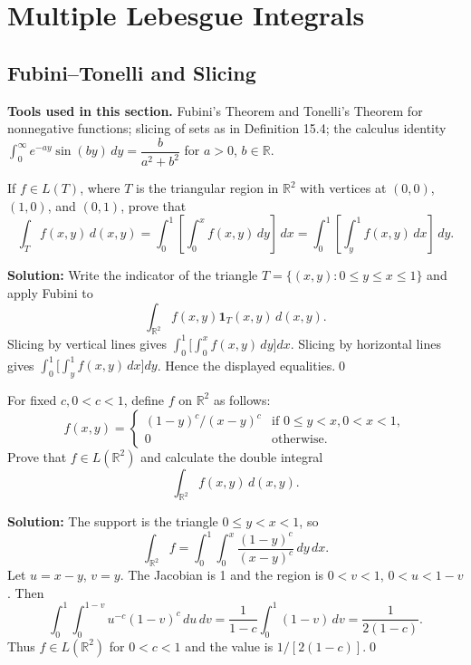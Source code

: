 \chapter{Multiple Lebesgue Integrals}


\section{Fubini--Tonelli and Slicing}
\noindent\textbf{Tools used in this section.} Fubini's Theorem and Tonelli's Theorem for nonnegative functions; slicing of sets as in Definition 15.4; the calculus identity \(\int_0^{\infty} e^{-ay} \sin(by) \, dy = \dfrac{b}{a^2 + b^2}\) for \(a>0\), \(b\in\mathbb{R}\).
 


\begin{problembox}
If \( f \in L(T) \), where \( T \) is the triangular region in \( \mathbb{R}^2 \) with vertices at \((0, 0)\), \((1, 0)\), and \((0, 1)\), prove that
\[
\int_T f(x, y) \, d(x, y) = \int_0^1 \left[ \int_0^x f(x, y) \, dy \right] \, dx = \int_0^1 \left[ \int_y^1 f(x, y) \, dx \right] \, dy.
\]
\end{problembox}

\noindent\textbf{Solution:}
Write the indicator of the triangle \(T=\{(x,y): 0\le y \le x \le 1\}\) and apply Fubini to
\[
\int_{\mathbb{R}^2} f(x,y) \mathbf{1}_T(x,y)\, d(x,y).
\]
Slicing by vertical lines gives \(\int_0^1\!\big[\int_0^x f(x,y)\,dy\big]dx\). Slicing by horizontal lines gives \(\int_0^1\!\big[\int_y^1 f(x,y)\,dx\big]dy\). Hence the displayed equalities.\qed


\begin{problembox}
For fixed \( c, 0 < c < 1 \), define \( f \) on \( \mathbb{R}^2 \) as follows:
\[
f(x, y) = 
\begin{cases} 
(1 - y)^c / (x - y)^c & \text{if } 0 \leq y < x, 0 < x < 1, \\
0 & \text{otherwise}.
\end{cases}
\]
Prove that \( f \in L(\mathbb{R}^2) \) and calculate the double integral 
\[
\int_{\mathbb{R}^2} f(x, y) \, d(x, y).
\]
\end{problembox}

\noindent\textbf{Solution:}
The support is the triangle \(0\le y < x < 1\), so
\[
\int_{\mathbb{R}^2} f = \int_0^1\!\int_0^x \frac{(1-y)^c}{(x-y)^c}\,dy\,dx.
\]
Let \(u=x-y\), \(v=y\). The Jacobian is 1 and the region is \(0<v<1\), \(0<u<1-v\). Then
\[
\int_0^1\!\int_0^{1-v} u^{-c}(1-v)^c\,du\,dv
= \frac{1}{1-c}\int_0^1 (1-v)\,dv = \frac{1}{2(1-c)}.
\]
Thus \(f\in L(\mathbb{R}^2)\) for \(0<c<1\) and the value is \(1/[2(1-c)]\).\qed


